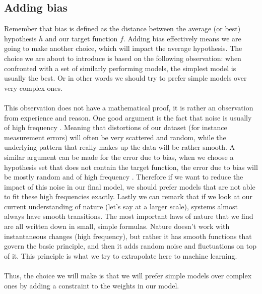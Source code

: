 \subsection{Adding bias}
Remember that bias is defined as the distance between the average (or best) hypothesis $\bar{h}$ and our target function $f$. Adding bias effectively means we are going to make another choice, which will impact the average hypothesis. The choice we are about to introduce is based on the following observation: when confronted with a set of similarly performing models, the simplest model is usually the best. Or in other words we should try to prefer simple models over very complex ones. \\ \\
This observation does not have a mathematical proof, it is rather an observation from experience and reason. One good argument is the fact that noise is usually of high frequency \cite{caltechmachinelearning}. Meaning that distortions of our dataset (for instance measurement errors) will often be very scattered and random, while the underlying pattern that really makes up the data will be rather smooth. A similar argument can be made for the error due to bias, when we choose a hypothesis set that does not contain the target function, the error due to bias will be mostly random and of high frequency \cite{caltechmachinelearning}. Therefore if we want to reduce the impact of this noise in our final model, we should prefer models that are not able to fit these high frequencies exactly. Lastly we can remark that if we look at our current understanding of nature (let's say at a larger scale), systems almost always have smooth transitions. The most important laws of nature that we find are all written down in small, simple formulas. Nature doesn't work with instantaneous changes (high frequency), but rather it has smooth functions that govern the basic principle, and then it adds random noise and fluctuations on top of it. This principle is what we try to extrapolate here to machine learning.\\\\
Thus, the choice we will make is that we will prefer simple models over complex ones by adding a constraint to the weights in our model.
